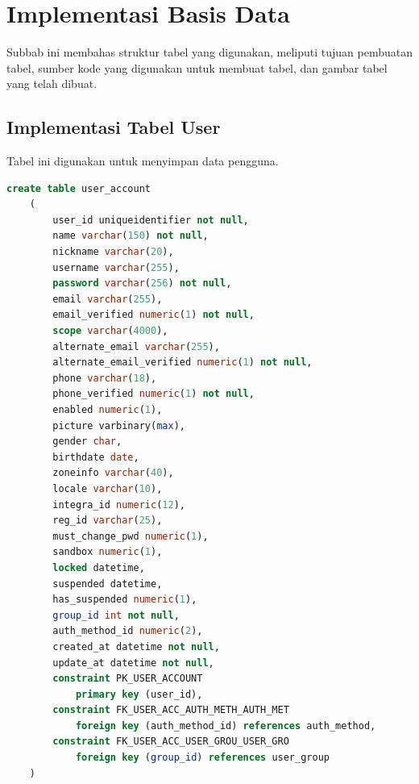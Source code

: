 \section{Implementasi Basis Data}
\par Subbab ini membahas struktur tabel yang digunakan, meliputi tujuan pembuatan tabel, sumber kode yang digunakan untuk membuat tabel, dan gambar tabel yang telah dibuat.

\subsection{Implementasi Tabel User}
\par Tabel ini digunakan untuk menyimpan data pengguna.
\begin{lstlisting}[language=sql, firstnumber=1, caption=Implementasi Tabel User]
    create table user_account
    (
        user_id uniqueidentifier not null,
        name varchar(150) not null,
        nickname varchar(20),
        username varchar(255),
        password varchar(256) not null,
        email varchar(255),
        email_verified numeric(1) not null,
        scope varchar(4000),
        alternate_email varchar(255),
        alternate_email_verified numeric(1) not null,
        phone varchar(18),
        phone_verified numeric(1) not null,
        enabled numeric(1),
        picture varbinary(max),
        gender char,
        birthdate date,
        zoneinfo varchar(40),
        locale varchar(10),
        integra_id numeric(12),
        reg_id varchar(25),
        must_change_pwd numeric(1),
        sandbox numeric(1),
        locked datetime,
        suspended datetime,
        has_suspended numeric(1),
        group_id int not null,
        auth_method_id numeric(2),
        created_at datetime not null,
        update_at datetime not null,
        constraint PK_USER_ACCOUNT
            primary key (user_id),
        constraint FK_USER_ACC_AUTH_METH_AUTH_MET
            foreign key (auth_method_id) references auth_method,
        constraint FK_USER_ACC_USER_GROU_USER_GRO
            foreign key (group_id) references user_group
    )
\end{lstlisting}
